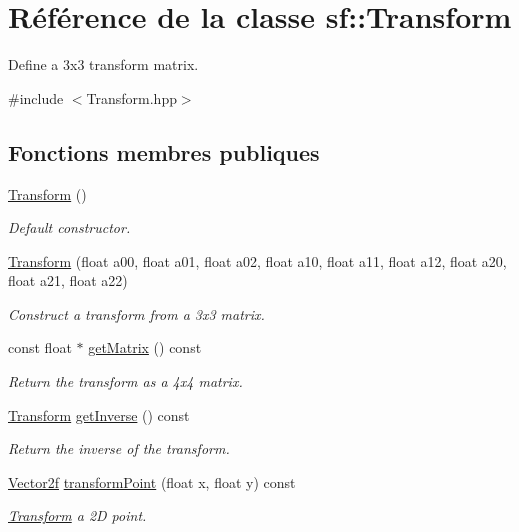 \hypertarget{classsf_1_1Transform}{}\section{Référence de la classe sf\+:\+:Transform}
\label{classsf_1_1Transform}


Define a 3x3 transform matrix.  




{\ttfamily \#include $<$Transform.\+hpp$>$}

\subsection*{Fonctions membres publiques}
\begin{DoxyCompactItemize}
\item 
\hyperlink{classsf_1_1Transform_ac32de51bd0b9f3d52fbe0838225ee83b}{Transform} ()
\begin{DoxyCompactList}\small\item\em Default constructor. \end{DoxyCompactList}\item 
\hyperlink{classsf_1_1Transform_a78c48677712fcf41122d02f1301d71a3}{Transform} (float a00, float a01, float a02, float a10, float a11, float a12, float a20, float a21, float a22)
\begin{DoxyCompactList}\small\item\em Construct a transform from a 3x3 matrix. \end{DoxyCompactList}\item 
const float $\ast$ \hyperlink{classsf_1_1Transform_ad52616cac686f47bd26bcbdd8e2add40}{get\+Matrix} () const
\begin{DoxyCompactList}\small\item\em Return the transform as a 4x4 matrix. \end{DoxyCompactList}\item 
\hyperlink{classsf_1_1Transform}{Transform} \hyperlink{classsf_1_1Transform_a14f49e81af44aabcff7611f6703a1e4a}{get\+Inverse} () const
\begin{DoxyCompactList}\small\item\em Return the inverse of the transform. \end{DoxyCompactList}\item 
\hyperlink{classsf_1_1Vector2}{Vector2f} \hyperlink{classsf_1_1Transform_af2e38c3c077d28898686662558b41135}{transform\+Point} (float x, float y) const
\begin{DoxyCompactList}\small\item\em \hyperlink{classsf_1_1Transform}{Transform} a 2D point. \end{DoxyCompactList}\item 

\end{DoxyCompactItemize}
